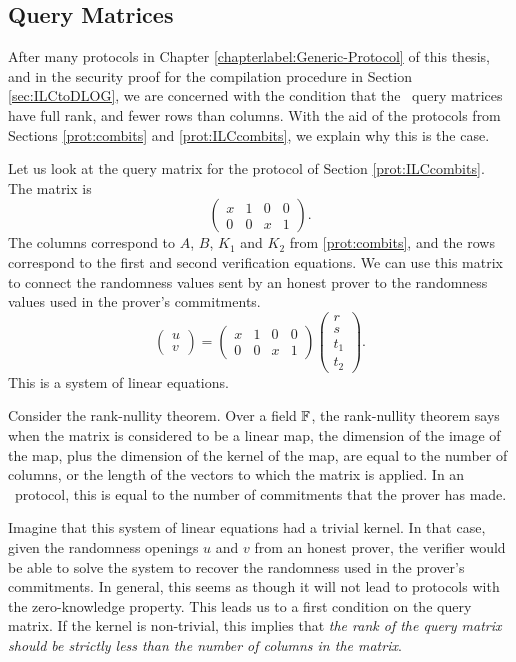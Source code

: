\subsection{Query Matrices}\label{subsec:rankexplain}

After many protocols in Chapter \ref{chapterlabel:Generic-Protocol} of this thesis, and in the security proof for the compilation procedure in Section \ref{sec:ILCtoDLOG}, we are concerned with the condition that the \ILC\ query matrices have full rank, and fewer rows than columns. With the aid of the protocols from Sections \ref{prot:combits} and \ref{prot:ILCcombits}, we explain why this is the case.

Let us look at the query matrix for the protocol of Section \ref{prot:ILCcombits}. The matrix is $$\begin{pmatrix} x & 1 & 0 & 0 \\ 0 & 0 & x & 1 \end{pmatrix}.$$ The columns correspond to $A$, $B$, $K_1$ and $K_2$ from \ref{prot:combits}, and the rows correspond to the first and second verification equations. We can use this matrix to connect the randomness values sent by an honest prover to the randomness values used in the prover's commitments.
$$\begin{pmatrix} u \\ v \end{pmatrix}  = \begin{pmatrix} x & 1 & 0 & 0 \\ 0 & 0 & x & 1 \end{pmatrix} \begin{pmatrix} r \\ s \\ t_1 \\ t_2 \end{pmatrix}.$$ This is a system of linear equations.

Consider the rank-nullity theorem. Over a field $\mathbb{F}$, the rank-nullity theorem says when the matrix is considered to be a linear map, the dimension of the image of the map, plus the dimension of the kernel of the map, are equal to the number of columns, or the length of the vectors to which the matrix is applied. In an \ILC\ protocol, this is equal to the number of commitments that the prover has made.

Imagine that this system of linear equations had a trivial kernel. In that case, given the randomness openings $u$ and $v$ from an honest prover, the verifier would be able to solve the system to recover the randomness used in the prover's commitments. In general, this seems as though it will not lead to protocols with the zero-knowledge property. This leads us to a first condition on the query matrix. If the kernel is non-trivial, this implies that \emph{the rank of the query matrix should be strictly less than the number of columns in the matrix}.

